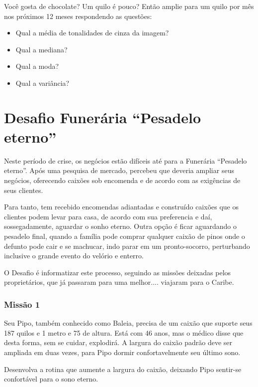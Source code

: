 \documentclass[
	12pt,				%
	oneside,			%
	a4paper,			%
	english,			%
	french,				%
	spanish,			%
	brazil,				%
	]{abntex2}
\begin{document}
\begin{apendicesenv}
Você gosta de chocolate? Um quilo é pouco? Então amplie para um quilo por mês nos próximos 12 meses respondendo as questões:

\begin{itemize}
  \item Qual a média de tonalidades de cinza da imagem?
  \item Qual a mediana?
  \item Qual a moda?
  \item Qual a variância?
\end{itemize}

\chapter{Desafio Funerária “Pesadelo eterno”}
\label{apen:transformacaoGeometrica}

Neste período de crise, os negócios estão difíceis até para a Funerária “Pesadelo eterno”. Após uma pesquisa de mercado, percebeu que deveria ampliar seus negócios, oferecendo caixões sob encomenda e de acordo com as exigências de seus clientes.

Para tanto, tem recebido encomendas adiantadas e construído caixões que os clientes podem levar para casa, de acordo com sua preferencia e daí, sossegadamente, aguardar o sonho eterno. Outra opção é ficar aguardando o pesadelo final, quando a família pode comprar qualquer caixão de pinos onde o defunto pode cair e se machucar, indo parar em um pronto-socorro, perturbando inclusive o grande evento do velório e enterro.

O Desafio é informatizar este processo, seguindo as missões deixadas pelos proprietários, que já passaram para uma melhor.... viajaram para o Caribe.

\subsection{Missão 1}

Seu Pipo, também conhecido como Baleia, precisa de um caixão que suporte seus 187 quilos e 1 metro e 75 de altura. Está com 46 anos, mas o médico disse que desta forma, sem se cuidar, explodirá. A largura do caixão padrão deve ser ampliada em duas vezes, para Pipo dormir confortavelmente seu último sono.

Desenvolva a rotina que aumente a largura do caixão, deixando Pipo sentir-se confortável para o sono eterno.


\end{apendicesenv}
\end{document}
